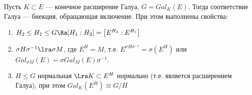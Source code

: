 \begin{theorem}
    Пусть \(K \subset E\) --- конечное расширение Галуа, \(G = Gal_K(E)\). Тогда соответствие Галуа --- биекция, обращающая включение. При этом выполнены свойства:
    \begin{enumerate}
        \item \(H_2 \le H_1 \le G \Ra [H_1:H_2] = \left[E^{H_2}:E^{H_1}\right]\)
        \item \(\sigma H \sigma^{-1} \lra \sigma M\), где \(E^H = M\), т.е. \(E^{\sigma H \sigma^{-1}} = \sigma(E^H)\) или \(Gal_{\sigma M}(E) = \sigma Gal_M(E) \sigma^{-1}\).
        \item \(H \le G\) нормальная \(\Lra K \subset E^H\) нормально (т.е. является расширением Галуа), при этом \(Gal_K(E^H) \cong G/H\)
    \end{enumerate}
\end{theorem}
